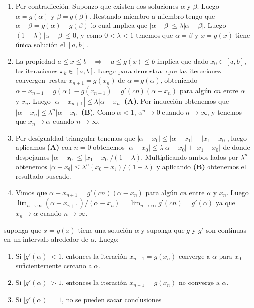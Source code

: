 \begin{enumerate}
\def\labelenumi{\arabic{enumi}.}
\item
  Por contradicción. Supongo que existen dos soluciones \(\alpha\) y
  \(\beta\). Luego \(\alpha = g(\alpha)\) y \(\beta = g(\beta)\).
  Restando miembro a miembro tengo que
  \(\alpha - \beta = g(\alpha) - g(\beta)\) lo cual implica que
  \(|\alpha - \beta| \leq \lambda |\alpha - \beta|\). Luego
  \((1 - \lambda)|\alpha - \beta| \leq 0\), y como \(0 < \lambda < 1\)
  tenemos que \(\alpha = \beta\) y \(x = g(x)\) tiene única solución el
  \([a,b]\).
\item
  La propiedad
  \(a \leq x \leq b \ensuremath{\quad\Longrightarrow\quad}a \leq g(x) \leq b\)
  implica que dado \(x_0 \in [a,b]\), las iteraciones \(x_k \in [a,b]\).
  Luego para demostrar que las iteraciones convergen, restar
  \(x_{n+1} = g(x_n)\) de \(\alpha = g(\alpha)\), obteniendo
  \(\alpha - x_{n+1} = g(\alpha) - g(x_{n+1}) = g'(cn)(\alpha - x_n)\)
  para algún \(cn\) entre \(\alpha\) y \(x_n\). Luego
  \(|\alpha - x_{n+1}| \leq \lambda |\alpha - x_n|\) \textbf{(A)}. Por
  inducción obtenemos que
  \(|\alpha - x_n| \leq \lambda^n |\alpha - x_0|\) \textbf{(B)}. Como
  \(\alpha < 1\), \(\alpha^n \rightarrow 0\) cuando
  \(n \rightarrow \infty\), y tenemos que \(x_n \rightarrow \alpha\)
  cuando \(n \rightarrow \infty\).
\item
  Por desigualdad triangular tenemos que
  \(|\alpha - x_0| \leq |\alpha - x_1| + |x_1 - x_0|\), luego aplicamos
  \textbf{(A)} con \(n = 0\) obtenemos
  \(|\alpha - x_0| \leq \lambda |\alpha - x_0| + |x_1 - x_0|\) de donde
  despejamos \(|\alpha - x_0| \leq |x_1 - x_0| / (1 - \lambda)\).
  Multiplicando ambos lados por \(\lambda^n\) obtenemos
  \(|\alpha - x_0| \leq \lambda^n(x_0 - x_1) / (1-\lambda)\) y aplicando
  \textbf{(B)} obtenemos el resultado buscado.
\item
  Vimos que \(\alpha - x_{n+1} = g'(cn)(\alpha - x_n)\) para algún
  \(cn\) entre \(\alpha\) y \(x_n\). Luego
  \(\ensuremath{\lim_{n \to \infty} (\alpha - x_{n+1})/(\alpha - x_n)} = \ensuremath{\lim_{n \to \infty} g'(cn)} = g'(\alpha)\)
  ya que \(x_n \rightarrow \alpha\) cuando \(n \rightarrow \infty\).
\end{enumerate}

\Corolario suponga que \(x = g(x)\) tiene una solución \(\alpha\) y
suponga que \(g\) y \(g'\) son continuas en un intervalo alrededor de
\(\alpha\). Luego:

\begin{enumerate}
\def\labelenumi{\arabic{enumi}.}
\tightlist
\item
  Si \(|g'(\alpha)| < 1\), entonces la iteración \(x_{n+1} = g(x_n)\)
  converge a \(\alpha\) para \(x_0\) suficientemente cercano a
  \(\alpha\).
\item
  Si \(|g'(\alpha)| > 1\), entonces la iteración \(x_{n+1} = g(x_n)\) no
  converge a \(\alpha\).
\item
  Si \(|g'(\alpha)| = 1\), no se pueden sacar conclusiones.
\end{enumerate}

